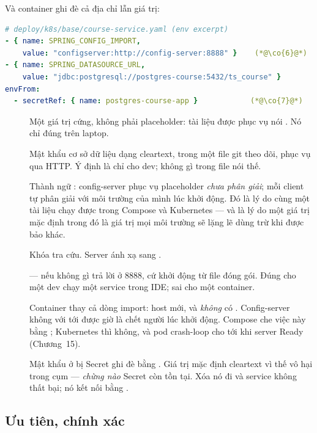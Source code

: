 Và container ghi đè cả địa chỉ lẫn giá trị:

\begin{lstlisting}[language=yaml]
# deploy/k8s/base/course-service.yaml (env excerpt)
- { name: SPRING_CONFIG_IMPORT,
    value: "configserver:http://config-server:8888" }    (*@\co{6}@*)
- { name: SPRING_DATASOURCE_URL,
    value: "jdbc:postgresql://postgres-course:5432/ts_course" }
envFrom:
  - secretRef: { name: postgres-course-app }            (*@\co{7}@*)
\end{lstlisting}

\begin{description}
  \item[] Một giá trị cứng, không phải placeholder: tài liệu được
  phục vụ nói . Nó chỉ đúng trên laptop.
  \item[] Mật khẩu cơ sở dữ liệu dạng cleartext, trong một file
  git theo dõi, phục vụ qua HTTP. Ý định là chỉ cho dev; không gì trong
  file nói thế.
  \item[] Thành ngữ : config-server phục vụ
  placeholder \emph{chưa phân giải}; mỗi client tự phân giải với môi
  trường của mình lúc khởi động. Đó là lý do cùng một tài liệu chạy
  được trong Compose và Kubernetes --- và là lý do một giá trị mặc định
  trong đó là giá trị mọi môi trường sẽ lặng lẽ dùng trừ khi được bảo
  khác.
  \item[] Khóa tra cứu. Server ánh xạ  sang
  .
  \item[]  --- nếu không gì trả lời ở 8888, cứ
  khởi động từ file đóng gói. Đúng cho một dev chạy một service trong
  IDE; sai cho một container.
  \item[] Container thay cả dòng import: host mới, và
  \emph{không} có . Config-server không với tới được giờ
  là chết người lúc khởi động. Compose che việc này bằng
  ; Kubernetes thì không,
  và pod crash-loop cho tới khi server Ready (Chương~15).
  \item[] Mật khẩu ở  bị Secret ghi đè bằng
  . Giá trị mặc định cleartext vì thế
  vô hại trong cụm --- \emph{chừng nào} Secret còn tồn tại. Xóa nó đi
  và service không thất bại; nó kết nối bằng .
\end{description}

\subsection{Ưu tiên, chính xác}

